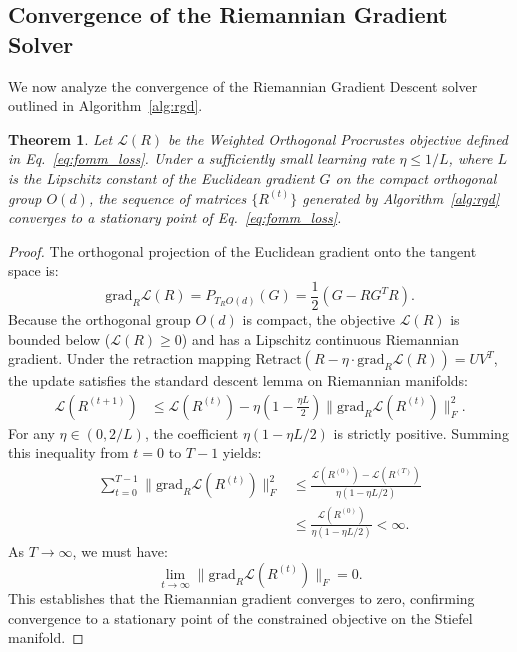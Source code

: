 \documentclass{article}
\theoremstyle{plain}
\newtheorem{theorem}{Theorem}[section]
\theoremstyle{definition}
\theoremstyle{remark}
\begin{document}
\subsection{Convergence of the Riemannian Gradient Solver}
We now analyze the convergence of the Riemannian Gradient Descent solver outlined in Algorithm~\ref{alg:rgd}.

\begin{theorem}
Let $\mathcal{L}(R)$ be the Weighted Orthogonal Procrustes objective defined in Eq.~\eqref{eq:fomm_loss}. Under a sufficiently small learning rate $\eta \le 1 / L$, where $L$ is the Lipschitz constant of the Euclidean gradient $G$ on the compact orthogonal group $O(d)$, the sequence of matrices $\{R^{(t)}\}$ generated by Algorithm~\ref{alg:rgd} converges to a stationary point of Eq.~\eqref{eq:fomm_loss}.
\end{theorem}

\begin{proof}
The orthogonal projection of the Euclidean gradient onto the tangent space is:
\begin{equation}
\text{grad}_R \mathcal{L}(R) = P_{T_R O(d)}(G) = \frac{1}{2}(G - R G^T R).
\end{equation}
Because the orthogonal group $O(d)$ is compact, the objective $\mathcal{L}(R)$ is bounded below ($\mathcal{L}(R) \ge 0$) and has a Lipschitz continuous Riemannian gradient. Under the retraction mapping $\text{Retract}(R - \eta \cdot \text{grad}_R \mathcal{L}(R)) = U V^T$, the update satisfies the standard descent lemma on Riemannian manifolds:
\begin{align}
\mathcal{L}(R^{(t+1)}) &\le \mathcal{L}(R^{(t)}) - \eta \left( 1 - \frac{\eta L}{2} \right) \|\text{grad}_R \mathcal{L}(R^{(t)})\|_F^2.
\end{align}
For any $\eta \in (0, 2/L)$, the coefficient $\eta (1 - \eta L/2)$ is strictly positive. Summing this inequality from $t = 0$ to $T-1$ yields:
\begin{align}
\sum_{t=0}^{T-1} \|\text{grad}_R \mathcal{L}(R^{(t)})\|_F^2 &\le \frac{\mathcal{L}(R^{(0)}) - \mathcal{L}(R^{(T)})}{\eta(1 - \eta L / 2)} \nonumber \\
&\le \frac{\mathcal{L}(R^{(0)})}{\eta(1 - \eta L / 2)} < \infty.
\end{align}
As $T \to \infty$, we must have:
\begin{equation}
\lim_{t \to \infty} \|\text{grad}_R \mathcal{L}(R^{(t)})\|_F = 0.
\end{equation}
This establishes that the Riemannian gradient converges to zero, confirming convergence to a stationary point of the constrained objective on the Stiefel manifold.
\end{proof}
\end{document}
